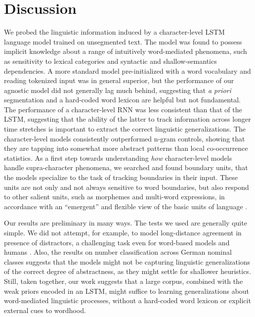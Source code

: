\section{Discussion}
\label{sec:discussion}

We probed the linguistic information induced by a character-level LSTM
language model trained on unsegmented text. The model was found to
possess implicit knowledge about a range of intuitively word-mediated
phenomena, such as sensitivity to lexical categories and syntactic and
shallow-semantics dependencies. A more standard model pre-initialized
with a word vocabulary and reading tokenized input was in general
superior, but the performance of our agnostic model did not generally
lag much behind, suggesting that \emph{a priori} segmentation and a
hard-coded word lexicon are helpful but not fundamental. The
performance of a character-level RNN was less consistent than that of
the LSTM, suggesting that the ability of the latter to track
information across longer time stretches is important to extract the
correct linguistic generalizations. The character-level models
consistently outperformed n-gram controls, showing that they are
tapping into somewhat more abstract patterns than local co-occurrence
statistics. As a first step towards understanding \emph{how}
character-level models handle supra-character phenomena, we searched
and found boundary units, that the models specialize to the task of
tracking boundaries in their input. These units are not only and not
always sensitive to word boundaries, but also respond to other salient
units, such as morphemes and multi-word expressions, in accordance
with an ``emergent'' and flexible view of the basic units of language
\cite{Schiering:etal:2010}.

Our results are preliminary in many ways. The tests we used are
generally quite simple. We did not attempt, for example, to model
long-distance agreement in presence of distractors, a challenging task
even for word-based models and humans
\citep{Gulordava:etal:2018}. Also, the results on number
classification across German nominal classes suggests that the models
might not be capturing linguistic generalizations of the correct
degree of abstractness, as they might settle for shallower
heuristics. Still, taken together, our work suggests that a large
corpus, combined with the weak priors encoded in an LSTM, might
suffice to learning generalizations about word-mediated linguistic
processes, without a hard-coded word lexicon or explicit external cues
to wordhood.

